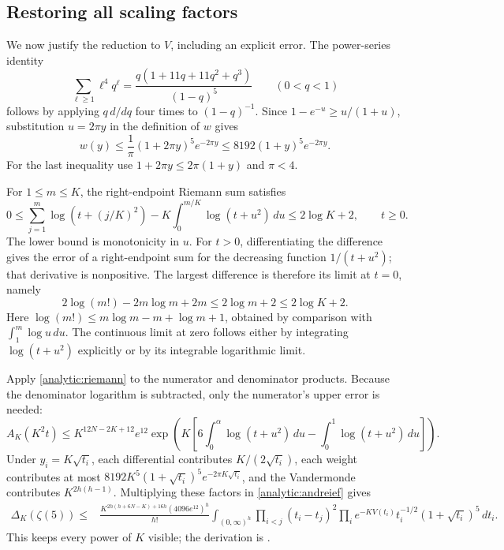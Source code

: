 \subsection{Restoring all scaling factors}

We now justify the reduction to \(V\), including an explicit error.
The power-series identity
\[
 \sum_{\ell\geq1}\ell^4q^\ell
       =\frac{q(1+11q+11q^2+q^3)}{(1-q)^5}
 \qquad(0<q<1)
\]
follows by applying \(q\,d/dq\) four times to \((1-q)^{-1}\).
Since \(1-e^{-u}\geq u/(1+u)\), substitution \(u=2\pi y\) in the
definition of \(w\) gives
\[
 w(y)\leq\frac1\pi(1+2\pi y)^5e^{-2\pi y}
       \leq8192(1+y)^5e^{-2\pi y}.
\]
For the last inequality use \(1+2\pi y\leq2\pi(1+y)\) and \(\pi<4\).

For \(1\leq m\leq K\), the right-endpoint Riemann sum satisfies
\begin{equation}\label{analytic:riemann}
 0\leq \sum_{j=1}^m\log(t+(j/K)^2)
               -K\int_0^{m/K}\log(t+u^2)\,du
       \leq2\log K+2,\qquad t\geq0.
\end{equation}
The lower bound is monotonicity in \(u\).
For \(t>0\), differentiating the difference gives the error of a
right-endpoint sum for the decreasing function \(1/(t+u^2)\);
that derivative is nonpositive. The largest difference is therefore
its limit at \(t=0\), namely
\[
 2\log(m!)-2m\log m+2m\leq2\log m+2\leq2\log K+2.
\]
Here \(\log(m!)\leq m\log m-m+\log m+1\), obtained by comparison
with \(\int_1^m\log u\,du\).
The continuous limit at zero follows either by integrating
\(\log(t+u^2)\) explicitly or by its integrable logarithmic limit.

Apply \eqref{analytic:riemann} to the numerator and denominator
products. Because the denominator logarithm is subtracted, only the
numerator's upper error is needed:
\[
 A_K(K^2t)\leq K^{12N-2K+12}e^{12}
  \exp\left(K\left[6\int_0^\alpha\log(t+u^2)\,du
                         -\int_0^1\log(t+u^2)\,du\right]\right).
\]
Under \(y_i=K\sqrt{t_i}\), each differential contributes
\(K/(2\sqrt{t_i})\), each weight contributes at most
\(8192K^5(1+\sqrt{t_i})^5e^{-2\pi K\sqrt{t_i}}\), and the
Vandermonde contributes \(K^{2h(h-1)}\).
Multiplying these factors in \eqref{analytic:andreief} gives
\begin{align}
 \Delta_K(\zeta(5))\leq{}&
 \frac{K^{2h(h+6N-K)+16h}(4096e^{12})^h}{h!}
 \int_{(0,\infty)^h}\prod_{i<j}(t_i-t_j)^2
 \prod_i e^{-KV(t_i)}t_i^{-1/2}(1+\sqrt{t_i})^5\,dt_i.
 \label{analytic:scaled-integral}
\end{align}
This keeps every power of \(K\) visible; the derivation is
\cite[(6.11)--(6.13)]{fauzan}.

